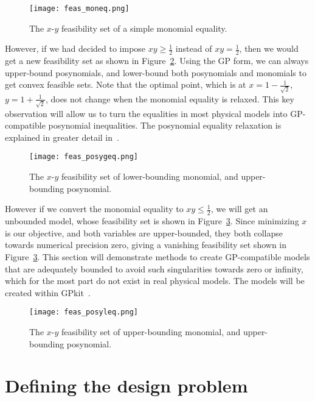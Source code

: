 \begin{figure}
    \centering
    \texttt{[image: feas\_moneq.png]}
    \caption{The $x$-$y$ feasibility set of a simple monomial equality.}
    \label{f:feas_moneq}
\end{figure}

However, if we had decided to impose $xy \geq \frac{1}{2}$ instead of $xy = \frac{1}{2}$,
then we would get a new feasibility set as shown in Figure~\ref{f:feas_posygeq}.
Using the \gls{GP} form, we can always upper-bound posynomials, and lower-bound both posynomials
and monomials to get convex feasible sets. Note that the optimal point, which is at
$x = 1 - \frac{1}{\sqrt{2}}$, $y = 1 + \frac{1}{\sqrt{2}}$,
does not change when the monomial equality is relaxed. This key
observation will allow us to turn the equalities in most physical models into \gls{GP}-compatible
posynomial inequalities. The posynomial equality relaxation is explained in greater detail
in~\cite{hoburg_thesis}.

\begin{figure}
    \centering
    \texttt{[image: feas\_posygeq.png]}
    \caption{The $x$-$y$ feasibility set of lower-bounding monomial,
    and upper-bounding posynomial.}
    \label{f:feas_posygeq}
\end{figure}

However if we convert the monomial equality to  $xy \leq \frac{1}{2}$, we will get an unbounded model,
whose feasibility set is shown in Figure~\ref{f:feas_posyleq}.
Since minimizing $x$ is our objective, and both variables are upper-bounded,
they both collapse towards numerical precision zero,
giving a vanishing feasibility set shown in Figure~\ref{f:feas_posyleq}. This section will
demonstrate methods to create \gls{GP}-compatible models that are adequately bounded to avoid such
singularities towards zero or infinity, which for the most part do not
exist in real physical models. The models will be created within GPkit~\cite{gpkit}.

\begin{figure}[H]
    \centering
    \texttt{[image: feas\_posyleq.png]}
    \caption{The $x$-$y$ feasibility set of upper-bounding monomial,
    and upper-bounding posynomial.}
    \label{f:feas_posyleq}
\end{figure}

\section{Defining the design problem}

